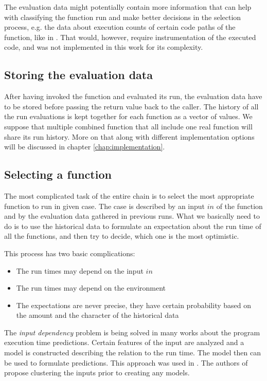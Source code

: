 The evaluation data might potentially contain more information that can help with classifying the function run and make better decisions in the selection process, e.g. the data about execution counts of certain code paths of the function, like in \cite{chun_mantis:_2010}. That would, however, require instrumentation of the executed code, and was not implemented in this work for its complexity.

\subsection{Storing the evaluation data}

After having invoked the function and evaluated its run, the evaluation data have to be stored before passing the return value back to the caller. The history of all the run evaluations is kept together for each function as a vector of values. We suppose that multiple combined function that all include one real function will share its run history. More on that along with different implementation options will be discussed in chapter \ref{chap:implementation}.

\subsection{Selecting a function}

The most complicated task of the entire chain is to select the most appropriate function to run in given case. The case is described by an input $in$ of the function  and by the evaluation data gathered in previous runs. What we basically need to do is to use the historical data to formulate an expectation about the run time of all the functions, and then try to decide, which one is the most optimistic.

This process has two basic complications:

\begin{itemize}
	\item The run times may depend on the input $in$
	\item The run times may depend on the environment
	\item The expectations are never precise, they have certain probability based on the amount and the character of the historical data
\end{itemize}

The \textit{input dependency} problem is being solved in many works about the program execution time predictions. Certain features of the input are analyzed and a model is constructed describing the relation to the run time. The model then can be used to formulate predictions. This approach was used in \cite{chun_mantis:_2010,goldsmith_measuring_2007}. The authors of \cite{smith_predicting_1998} propose clustering the inputs prior to creating any models.


